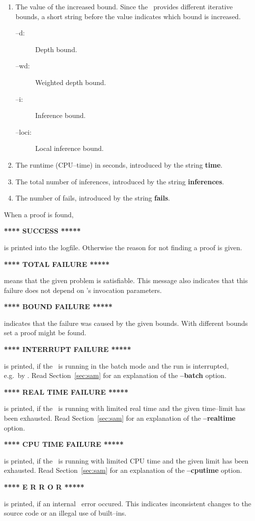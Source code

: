 \begin{enumerate}
\item The value of the increased bound. Since the \SAM\ provides
      different iterative bounds, a short string before the value
      indicates which bound is increased.
      \begin{description}
      \item [--d:] Depth bound.
      \item [--wd:] Weighted depth bound.
      \item [--i:] Inference bound.
      \item [--loci:] Local inference bound.
      \end{description}
\item The runtime (CPU--time) in seconds, introduced by the string
      {\bf time}. 
\item The total number of inferences, introduced by the string {\bf
      inferences}. 
\item The number of fails, introduced by the string {\bf fails}.
\end{enumerate}

When a proof is found,
\begin{center} 
{\bf ***** SUCCESS *****}
\end{center}
is printed into the logfile. Otherwise the reason for not finding a
proof is given. 
\begin{center} 
{\bf ***** TOTAL FAILURE *****}
\end{center}
means that the given problem is satisfiable. This message also
indicates that this failure does not depend on \SAM's invocation
parameters. 
\begin{center} 
{\bf ***** BOUND FAILURE *****}
\end{center}
indicates that the failure was caused by the given bounds. With
different bounds set a proof might be found.
\begin{center} 
{\bf ***** INTERRUPT FAILURE *****}
\end{center}
is printed, if the \SAM\ is running in the batch mode and the run is
interrupted, e.g.\ by \Cc. Read Section~\ref{sec:sam} for an
explanation of the {\bf --batch} option. 
\begin{center} 
{\bf ***** REAL TIME FAILURE *****}
\end{center} 
is printed, if the \SAM\ is running with limited real time and the
given time--limit has been exhausted. Read Section~\ref{sec:sam} for an
explanation of the {\bf --realtime} option.
\begin{center} 
{\bf ***** CPU TIME FAILURE *****}
\end{center} 
is printed, if the \SAM\ is running with limited CPU time and the
given limit has been exhausted. Read Section~\ref{sec:sam} for an
explanation of the {\bf --cputime} option.
\begin{center} 
{\bf ***** E R R O R *****}
\end{center}
is printed, if an internal \SAM\ error occured. This indicates
inconsistent changes to the source code or an illegal use of
built--ins. 


